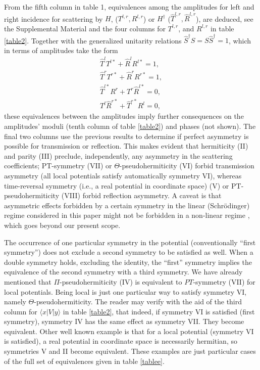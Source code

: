 From the fifth column in table 1, equivalences among the amplitudes for left and right incidence
for scattering by $H$, ($T^{l,r}, R^{l,r}$) or $H^\dagger$  ($\widehat{T}^{l,r}, \widehat{R}^{l,r}$),
are deduced, see the Supplemental Material  and the four columns for
$T^{l,r}$, and $R^{l,r}$ in table \ref{table2}.
Together with the generalized unitarity relations $\widehat{S}^\dagger S=S\widehat{S}^\dagger=1$,
which in terms of amplitudes take the form \cite{Muga2004}
%
\begin{eqnarray}
  \widehat T^l T^{l*} + \widehat R^l R^{l*} = 1,
  \nonumber\\
  \widehat T^r T^{r*} + \widehat R^r R^{r*} = 1,
  \nonumber\\
  \hat T^{l*} R^r + T^r \widehat R^{l*} = 0,
  \nonumber\\
  T^l \widehat R^{r*} + \widehat T^{r*} R^l = 0,
  \label{gur}
\end{eqnarray}
%
these equivalences  between the amplitudes
imply further consequences on the amplitudes' moduli (tenth column of table \ref{table2}) and phases (not shown).
The final two columns use the previous results to determine if perfect asymmetry is possible for transmission or reflection.
This makes evident that hermiticity (II) and parity (III) preclude, independently, any asymmetry in the scattering coefficients;
PT-symmetry (VII) or  $\Theta$-pseudohermiticity
(VI) forbid transmission asymmetry (all local potentials  satisfy automatically
symmetry VI),  whereas time-reversal symmetry (i.e., a real potential in coordinate space)
(V) or  PT-pseudohermiticity (VIII) forbid reflection asymmetry.
A caveat is that asymmetric effects forbidden by a certain symmetry in the linear (Schr\"odinger)
regime considered in this paper might not be forbidden in a non-linear regime \cite{Xu2014}, which goes beyond our present scope.

The occurrence of one particular symmetry in the potential (conventionally  ``first symmetry'')
does not exclude a second symmetry to be satisfied as well.
When a double symmetry holds, excluding the identity,  the ``first'' symmetry  implies the equivalence of the second symmetry with a third symmetry.
We have already mentioned that $\Pi$-pseudohermiticity (IV) is equivalent to $PT$-symmetry (VII) for local potentials.
Being local is just one particular way to satisfy symmetry VI, namely $\Theta$-pseudohermiticity. The reader may verify with the aid of
the third column for $\langle x|V|y\rangle$  in table \ref{table2}, that indeed, if symmetry VI is satisfied (first symmetry), symmetry IV has the same effect as symmetry VII.
They become equivalent. Other well known example is  that for a local potential (symmetry VI is satisfied), a real potential in coordinate space  is necessarily hermitian,
so symmetries V and II become equivalent.
These examples are just particular cases of the full set of equivalences given in table \ref{tablee}.

